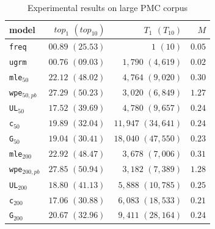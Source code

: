 \documentclass[11pt,a4paper]{article}
\begin{document}
\begin{table}[h]
\begin{center}
\begin{tabular}{lrrr}
model &  $top_{1}$ $(top_{10})$ & $T_{1}$ $(T_{10})$ & $M$ \\ \hline
\texttt{freq} & $00.89$ $(25.53)$ & $1$ $(10)$ & $0.05$ \\
\texttt{ugrm} & $00.76$ $(09.03)$  & $1,790$ $(4,619)$ & $0.02$\\
\addlinespace[1ex]

{\tt mle}$_{50}$ & $22.12$ $(48.02)$  & $4,764$ $(9,020)$ & $0.30$\\
{\tt wpe}$_{50,pb}$ & $27.29$ $(50.23)$ & $3,020$ $(6,849)$ & $1.27$ \\
{\tt UL}$_{50}$ & $17.52$ $(39.69)$ & $4,780$ $(9,657)$ & $0.24$  \\
{\tt c}$_{50}$ & $19.89$ $(32.04)$  & $11,947$ $(34,641)$ & $0.24$ \\
{\tt G}$_{50}$ & $19.04$ $(30.41)$  & $18,040$ $(47,550)$  & $0.23$\\
\addlinespace[1ex]

{\tt mle}$_{200}$ & $22.92$ $(48.47)$ & $3,678$ $(7,006)$ & $0.31$ \\
{\tt wpe}$_{200,pb}$ & $27.85$ $(50.94)$ & $3,182$ $(7,389)$ & $1.28$ \\
{\tt UL}$_{200}$ & $18.80$ $(41.13)$ & $5,888$ $(10,785)$ & $0.25$ \\
{\tt c}$_{200}$ & $17.06$ $(30.88)$ & $6,083$ $(18,533)$ & $0.21$  \\
{\tt G}$_{200}$ & $20.67$ $(32.96)$  & $9,411$ $(28,164)$ & $0.24$\\ 

\end{tabular}
\end{center}
\vspace{-0.1in}
\caption{\label{pb} Experimental results on large PMC corpus}
\vspace{-0.1in}
\end{table}
\end{document}
